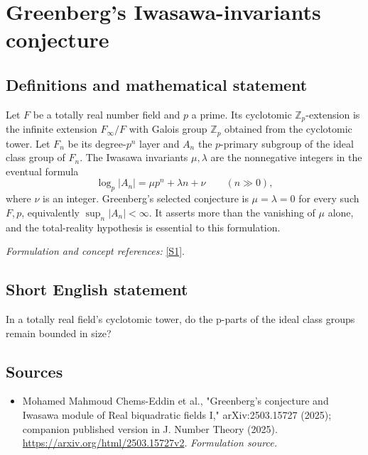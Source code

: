 \documentclass[11pt]{article}
\begin{document}
\section*{\texorpdfstring{Greenberg's Iwasawa-invariants conjecture}{Greenberg's Iwasawa-invariants conjecture}}\label{statement}
\subsection{Definitions and mathematical statement}
Let $F$ be a totally real number field and $p$ a prime. Its cyclotomic ${\mathbb{Z}}_p$-extension is the infinite extension $F_\infty/F$ with Galois group ${\mathbb{Z}}_p$ obtained from the cyclotomic tower. Let $F_n$ be its degree-$p^n$ layer and $A_n$ the $p$-primary subgroup of the ideal class group of $F_n$. The Iwasawa invariants $\mu,\lambda$ are the nonnegative integers in the eventual formula
\[
 \log_p|A_n|=\mu p^n+\lambda n+\nu\qquad(n\gg0),
\]
where $\nu$ is an integer. Greenberg's selected conjecture is $\mu=\lambda=0$ for every such $F,p$, equivalently $\sup_n|A_n|<\infty$. It asserts more than the vanishing of $\mu$ alone, and the total-reality hypothesis is essential to this formulation.
\par\smallskip\textit{Formulation and concept references:} \href{https://arxiv.org/html/2503.15727v2}{[S1]}.

\subsection{Short English statement}
In a totally real field's cyclotomic tower, do the p-parts of the ideal class groups remain bounded in size?
\subsection{Sources}
\begin{itemize}
\item[S1]Mohamed Mahmoud Chems-Eddin et al., "Greenberg's conjecture and Iwasawa module of Real biquadratic fields I," arXiv:2503.15727 (2025); companion published version in J. Number Theory (2025).
\url{https://arxiv.org/html/2503.15727v2}.
\textit{Formulation source.}
\end{itemize}
\end{document}
